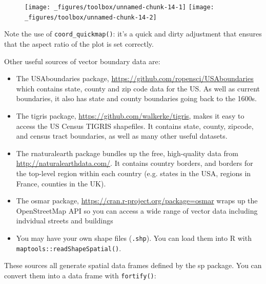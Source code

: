 \begin{figure}[H]
  \texttt{[image: \_figures/toolbox/unnamed-chunk-14-1]}%
  \texttt{[image: \_figures/toolbox/unnamed-chunk-14-2]}
\end{figure}

Note the use of \texttt{coord\_quickmap()}: it's a quick and dirty
adjustment that ensures that the aspect ratio of the plot is set
correctly.

Other useful sources of vector boundary data are:

\begin{itemize}
\item
  The USAboundaries package,
  \url{https://github.com/ropensci/USAboundaries} which contains state,
  county and zip code data for the US. As well as current boundaries, it
  also has state and county boundaries going back to the 1600s.
\item
  The tigris package, \url{https://github.com/walkerke/tigris}, makes it
  easy to access the US Census TIGRIS shapefiles. It contains state,
  county, zipcode, and census tract boundaries, as well as many other
  useful datasets.
\item
  The rnaturalearth package bundles up the free, high-quality data from
  \url{http://naturalearthdata.com/}. It contains country borders, and
  borders for the top-level region within each country (e.g. states in
  the USA, regions in France, counties in the UK).
\item
  The osmar package, \url{https://cran.r-project.org/package=osmar}
  wraps up the OpenStreetMap API so you can access a wide range of
  vector data including indvidual streets and buildings
\item
  You may have your own shape files (\texttt{.shp}). You can load them
  into R with \texttt{maptools::readShapeSpatial()}.
\end{itemize}

These sources all generate spatial data frames defined by the sp
package. You can convert them into a data frame with \texttt{fortify()}:

